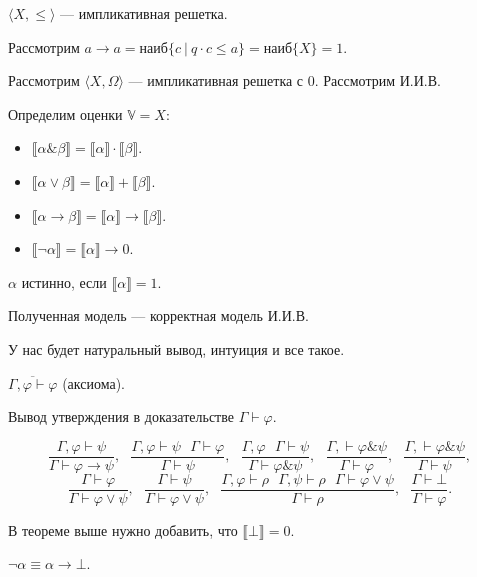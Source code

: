 \begin{theorem}
     $\langle X, \leqslant \rangle$ --- импликативная решетка.
    
    Рассмотрим $a \to a= \text{наиб} \{ c ~|~ q \cdot c \leqslant a\} = \text{наиб} \{ X \} = 1$.
\end{theorem}

\begin{theorem}
    Рассмотрим $\langle X, \Omega \rangle$ --- импликативная решетка с $0$. Рассмотрим И.И.В.


    Определим оценки $\mathbb{V}  = X$:
    \begin{itemize}
        \item     $\llbracket \alpha \& \beta \rrbracket = \llbracket\alpha \rrbracket \cdot \llbracket\beta \rrbracket$.
        \item     $\llbracket \alpha \vee \beta \rrbracket = \llbracket\alpha \rrbracket + \llbracket\beta \rrbracket$.
        \item     $\llbracket \alpha \to \beta \rrbracket = \llbracket\alpha \rrbracket \to \llbracket\beta \rrbracket$.
        \item     $\llbracket \neg \alpha \rrbracket = \llbracket\alpha \rrbracket \to 0$.
    \end{itemize}

    $\alpha$ истинно, если $\llbracket \alpha \rrbracket = 1$.

    Полученная модель --- корректная модель И.И.В.
\end{theorem}

У нас будет натуральный вывод, интуиция и все такое.

$\overline{\Gamma, \varphi \vdash \varphi}$ (аксиома).

Вывод утверждения в доказательстве $\Gamma \vdash \varphi$.

\[
    \dfrac{\Gamma, \varphi \vdash \psi}{\Gamma \vdash \varphi \to \psi},~~~
    \dfrac{\Gamma, \varphi \vdash \psi~~~ \Gamma \vdash \varphi}{\Gamma \vdash \psi},~~~
    \dfrac{\Gamma, \varphi ~~~ \Gamma \vdash \psi}{\Gamma \vdash \varphi \& \psi},~~~
    \dfrac{\Gamma, \vdash \varphi \& \psi}{\Gamma \vdash \varphi},~~~
    \dfrac{\Gamma, \vdash \varphi \& \psi}{\Gamma \vdash \psi},
\]\[
    \dfrac{\Gamma \vdash \varphi}{\Gamma\vdash\varphi \vee \psi},~~~
    \dfrac{\Gamma \vdash \psi}{\Gamma\vdash\varphi \vee \psi},~~~
    \dfrac{\Gamma, \varphi \vdash \rho~~~ \Gamma, \psi \vdash \rho~~~ \Gamma \vdash \varphi \vee \psi}{\Gamma\vdash\rho},~~~
    \dfrac{\Gamma \vdash \bot }{\Gamma\vdash\varphi}.
\]

В теореме выше нужно добавить, что $\llbracket\bot \rrbracket = 0$.

$\neg \alpha \equiv \alpha \to \bot$.

\endinput